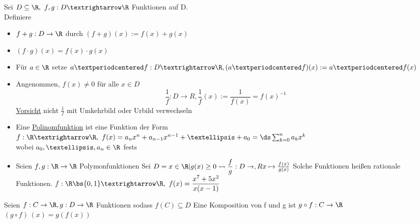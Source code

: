 %
Sei $D \subseteq \R , \ f,g: D→\R$ Funktionen auf D.\\
Definiere
\begin{itemize}
\item{$f+g: D \to \R$ durch $(f + g)(x) := f(x) + g(x)$}
\item{$(f \cdot  g) (x) = f(x) \cdot g(x)$}
\item{Für $a\in\R$ setze $a·f: D→\R, (a·f)(x):=a·f(x)$}
\item{Angenommen, $f(x) \neq 0$ für alle $x \in D$ \\
$$\frac{1}{f}: D \to R, \frac{1}{f}(x) := \frac{1}{f(x)} = f(x)^{-1}$$
\underline{\underline{Vorsicht}} nicht $\frac{1}{f}$ mit Umkehrbild oder Urbild verwechseln}
\end{itemize}
%
\begin{itemize}
\item{Eine \underline{Polinomfunktion} ist eine Funktion der Form\\
$f: \R → \R,\ f(x) = a_n x^n+a_{n-1}x^{n-1}+…+a_0=\ds\sum_{k=0}^n a_k x^k $\\
wobei $a_0,…,a_n \in \R$ fest}s
%
\item{Seien $f, g : \R \to \R $ Polymonfunktionen
Sei $D = {x \in \R | g(x) \geq 0}\leadsto \dfrac{f}{g} : D \to , Rx \mapsto \frac{f(x)}{g(x)}$
Solche Funktionen heißen rationale Funktionen.
\bsp
$f:\R\bs\{0,1\}→\R, \ f(x)=\dfrac{x^7+5x^2}{x(x-1)}$}
\end{itemize}
Seien $f: C \to \R, g: D \to \R$ Funktionen sodass $f(C) \subseteq D$
Eine Komposition von f und g ist 
%
$g \circ f : C \to \R$\\
$(g \circ f) \ (x) = g(f(x))$